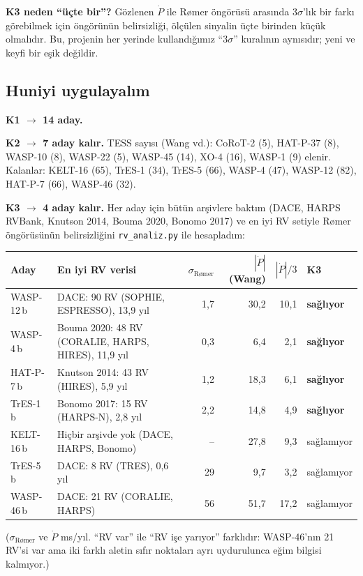 \textbf{K3 neden “üçte bir”?} Gözlenen $\dot P$ ile Rømer öngörüsü arasında 3$\sigma$'lık bir farkı görebilmek için
öngörünün belirsizliği, ölçülen sinyalin üçte birinden küçük olmalıdır. Bu, projenin her yerinde kullandığımız
“3$\sigma$” kuralının aynısıdır; yeni ve keyfi bir eşik değildir.

\subsection{Huniyi uygulayalım}
\textbf{K1 $\rightarrow$ 14 aday.}

\textbf{K2 $\rightarrow$ 7 aday kalır.} TESS sayısı (Wang vd.): CoRoT-2 (5), HAT-P-37 (8), WASP-10 (8), WASP-22 (5),
WASP-45 (14), XO-4 (16), WASP-1 (9) elenir. Kalanlar: KELT-16 (65), TrES-1 (34), TrES-5 (66), WASP-4 (47), WASP-12 (82),
HAT-P-7 (66), WASP-46 (32).

\textbf{K3 $\rightarrow$ 4 aday kalır.} Her aday için bütün arşivlere baktım (DACE, HARPS RVBank, Knutson 2014,
Bouma 2020, Bonomo 2017) ve en iyi RV setiyle Rømer öngörüsünün belirsizliğini \texttt{rv\_analiz.py} ile hesapladım:

\begin{center}
\small
\begin{tabularx}{\textwidth}{l >{\raggedright\arraybackslash}X r r r l}
\toprule
Aday & En iyi RV verisi & $\sigma_\text{Rømer}$ & $|\dot P|$ (Wang) & $|\dot P|/3$ & K3\\
\midrule
WASP-12\,b & DACE: 90 RV (SOPHIE, ESPRESSO), 13,9 yıl & 1,7 & 30,2 & 10,1 & \textbf{sağlıyor}\\
WASP-4\,b  & Bouma 2020: 48 RV (CORALIE, HARPS, HIRES), 11,9 yıl & 0,3 & 6,4 & 2,1 & \textbf{sağlıyor}\\
HAT-P-7\,b & Knutson 2014: 43 RV (HIRES), 5,9 yıl & 1,2 & 18,3 & 6,1 & \textbf{sağlıyor}\\
TrES-1\,b  & Bonomo 2017: 15 RV (HARPS-N), 2,8 yıl & 2,2 & 14,8 & 4,9 & \textbf{sağlıyor}\\
KELT-16\,b & Hiçbir arşivde yok (DACE, HARPS, Bonomo) & -- & 27,8 & 9,3 & sağlamıyor\\
TrES-5\,b  & DACE: 8 RV (TRES), 0,6 yıl & 29 & 9,7 & 3,2 & sağlamıyor\\
WASP-46\,b & DACE: 21 RV (CORALIE, HARPS) & 56 & 51,7 & 17,2 & sağlamıyor\\
\bottomrule
\end{tabularx}
\end{center}
($\sigma_\text{Rømer}$ ve $\dot P$ ms/yıl. “RV var” ile “RV işe yarıyor” farklıdır: WASP-46'nın 21 RV'si var ama iki
farklı aletin sıfır noktaları ayrı uydurulunca eğim bilgisi kalmıyor.)

